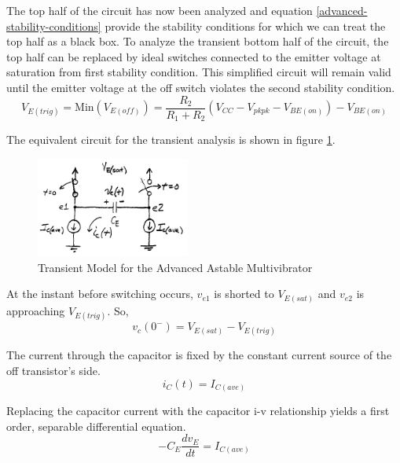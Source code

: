 \documentclass[titlepage, letterpaper, 10.5pt]{article}
\begin{document}
The top half of the circuit has now been analyzed and equation
\ref{advanced-stability-conditions} provide the stability conditions for
which we can treat the top half as a black box. To analyze the transient
bottom half of the circuit, the top half can be replaced by ideal switches
connected to the emitter voltage at saturation from first stability condition.
This simplified circuit will remain valid until the emitter voltage at the off
switch violates the second stability condition.
\begin{equation}
V_{E(trig)}=\textrm{Min}(V_{E(off)})=\frac{R_{2}}{R_{1}+R_{2}}(V_{CC}-V_{pkpk}-V_{BE(on)})-V_{BE(on)}
\label{advanced-ve-trig-eq}
\end{equation}

The equivalent circuit for the transient analysis is shown in figure
\ref{advanced-transient-circuit}.

\begin{figure}[ht]
	\centering
	\includegraphics[width=0.45\textwidth]{diagrams/advanced-transient-circuit}
	\caption{Transient Model for the Advanced Astable Multivibrator}
	\label{advanced-transient-circuit}
\end{figure}

At the instant before switching occurs, $v_{e1}$ is shorted to $V_{E(sat)}$ and
$v_{e2}$ is approaching $V_{E(trig)}$. So,
\begin{equation}
v_{c}(0^{-})=V_{E(sat)}-V_{E(trig)}
\label{advanced-initial-condition}
\end{equation}

The current through the capacitor is fixed by the constant current source
of the off transistor's side.
\begin{equation*}
i_{C}(t)=I_{C(ave)}
\end{equation*}

Replacing the capacitor current with the capacitor i-v relationship yields
a first order, separable differential equation.
\begin{equation*}
-C_{E}\frac{dv_{E}}{dt}=I_{C(ave)}
\end{equation*}
\end{document}
